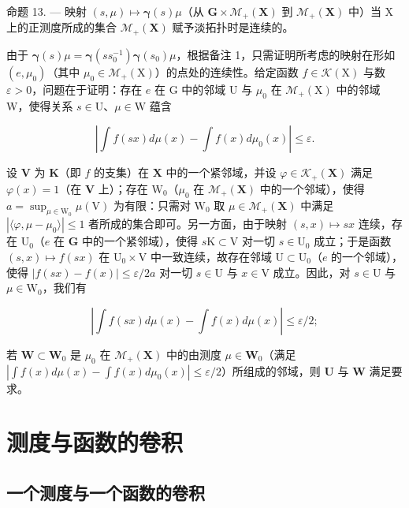 命题 13. --- 映射 \((s,\mu)\mapsto\boldsymbol{\gamma}(s)\mu\)（从 \(\mathbf{G}\times\mathcal{M}_{+}(\mathbf{X})\) 到 \(\mathcal{M}_{+}(\mathbf{X})\) 中）当 X 上的正测度所成的集合 \(\mathcal{M}_{+}(\mathbf{X})\) 赋予淡拓扑时是连续的。

由于 \(\pmb{\gamma}(s)\mu = \pmb{\gamma}(ss_0^{-1})\pmb{\gamma}(s_0)\mu\)，根据备注 1，只需证明所考虑的映射在形如 \((e,\mu_0)\)（其中 \(\mu_0\in \mathcal{M}_+(\mathrm{X})\)）的点处的连续性。给定函数 \(f\in \mathcal{K}(\mathrm{X})\) 与数 \(\varepsilon >0\)，问题在于证明：存在 \(e\) 在 G 中的邻域 U 与 \(\mu_0\) 在 \(\mathcal{M}_+(\mathrm{X})\) 中的邻域 W，使得关系 \(s\in \mathrm{U}\)、\(\mu \in \mathrm{W}\) 蕴含

\[
\left| \int f (s x) d \mu (x) - \int f (x) d \mu_ {0} (x) \right| \leqslant \varepsilon .\tag{6}
\]

设 \(\mathbf{V}\) 为 \(\mathbf{K}\)（即 \(f\) 的支集）在 \(\mathbf{X}\) 中的一个紧邻域，并设 \(\varphi \in \mathcal{K}_{+}(\mathbf{X})\) 满足 \(\varphi(x) = 1\)（在 \(\mathbf{V}\) 上）；存在 \(\mathrm{W}_0\)（\(\mu_0\) 在 \(\mathcal{M}_{+}(\mathbf{X})\) 中的一个邻域），使得 \(a = \sup_{\mu \in \mathrm{W}_0} \mu(\mathrm{V})\) 为有限：只需对 \(\mathrm{W}_0\) 取 \(\mu \in \mathcal{M}_{+}(\mathbf{X})\) 中满足 \(|\langle \varphi, \mu - \mu_0 \rangle| \leqslant 1\) 者所成的集合即可。另一方面，由于映射 \((s, x) \mapsto sx\) 连续，存在 \(\mathrm{U}_0\)（\(e\) 在 \(\mathbf{G}\) 中的一个紧邻域），使得 \(s\mathrm{K} \subset \mathrm{V}\) 对一切 \(s \in \mathrm{U}_0\) 成立；于是函数 \((s, x) \mapsto f(sx)\) 在 \(\mathrm{U}_0 \times \mathrm{V}\) 中一致连续，故存在邻域 \(\mathrm{U} \subset \mathrm{U}_0\)（\(e\) 的一个邻域），使得 \(|f(sx) - f(x)| \leqslant \varepsilon / 2a\) 对一切 \(s \in \mathrm{U}\) 与 \(x \in \mathrm{V}\) 成立。因此，对 \(s \in \mathrm{U}\) 与 \(\mu \in \mathrm{W}_0\)，我们有

\[
\left| \int f (s x) d \mu (x) - \int f (x) d \mu (x) \right| \leqslant \varepsilon / 2;
\]

若 \(\mathbf{W} \subset \mathbf{W}_0\) 是 \(\mu_0\) 在 \(\mathcal{M}_{+}(\mathbf{X})\) 中的由测度 \(\mu \in \mathbf{W}_0\)（满足 \(|\int f(x) d\mu(x) - \int f(x) d\mu_0(x)| \leqslant \varepsilon/2\)）所组成的邻域，则 \(\mathbf{U}\) 与 \(\mathbf{W}\) 满足要求。

\section{测度与函数的卷积}

\subsection{一个测度与一个函数的卷积}

